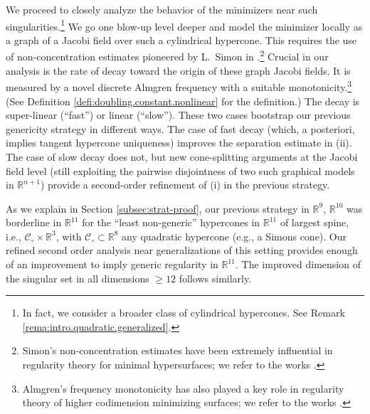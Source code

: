 \documentclass[11pt, letterpaper, reqno]{amsart}
\numberwithin{equation}{section}
\theoremstyle{remark}
\newcommand{\RR}{\mathbb{R}}
\newcommand{\cC}{\mathcal{C}}
\begin{document}
We proceed to closely analyze the behavior of the minimizers near such singularities.\footnote{In fact, we consider a broader class of cylindrical hypercones. See Remark \ref{rema:intro.quadratic.generalized}.} We go one blow-up level deeper and model the minimizer locally as a graph of a Jacobi field over such a cylindrical hypercone. This requires the use of {non-concentration estimates} pioneered by L.\ Simon in \cite{Simon:cylindrical-sing,Simon:uniqueness.some}.\footnote{Simon's non-concentration estimates have been extremely influential in regularity theory for minimal hypersurfaces; we refer to the works \cite{Wickramasekera:stable,CES:tetrahedron,MW:structure,Szkelyhidi:unique,Szkelyhidi:cylindrical,EdelenSzekelyhidi:liouville}.} Crucial in our analysis is the rate of decay toward the origin of these graph Jacobi fields. It is measured by a novel discrete {Almgren frequency} with a suitable monotonicity.\footnote{Almgren's frequency monotonicity has also played a key role in regularity theory of higher codimension minimizing surfaces; we refer to the works \cite{Almgren:book, DeLellisSpadaro:iii, KrummelWickramasekera:i, KrummelWickramasekera:ii, DeLellisSkorobogatova:i, DeLellisSkorobogatova:ii, DeLellisMinterSkorobogatova:iii}.} (See Definition \ref{defi:doubling.constant.nonlinear} for the definition.) The decay is super-linear (``fast'') or linear (``slow''). These two cases bootstrap our previous genericity strategy in different ways. The case of fast decay (which, a posteriori, implies tangent hypercone uniqueness) improves the separation estimate in (ii). The case of slow decay does not, but new cone-splitting arguments at the Jacobi field level (still exploiting the pairwise disjointness of two such graphical models in $\RR^{n+1}$) provide a second-order refinement of (i) in the previous strategy.

As we explain in Section \ref{subsec:strat-proof}, our previous strategy in $\RR^9$, $\RR^{10}$ was borderline in $\RR^{11}$ for the ``least non-generic'' hypercones in $\RR^{11}$ of largest spine, i.e., $\cC_\circ \times \RR^3$, with $\cC_\circ \subset \RR^8$ any quadratic hypercone (e.g., a Simons cone). Our refined second order analysis near generalizations of this setting provides enough of an improvement to imply generic regularity in $\RR^{11}$. The improved dimension of the singular set in all dimensions $\geq 12$ follows similarly.
\end{document}
